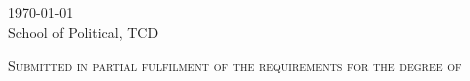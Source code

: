 \begin{titlepage}
    
    \textsc{{\large \today}}\\[2cm] %
    
    {School of Political, TCD}
    \vfill
    
    \textsc{\normalsize Submitted in partial fulfilment of the requirements for the degree of \\
    \degree}
    
    \vfill %
    
\end{titlepage}
